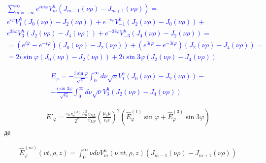 \textcolor{blue} { \begin{equation*} \begin{aligned}
\sum_{m=-\infty}^\infty e^{im \varphi}
V_m^h \left( J_{m-1} (\nu \rho) - J_{m+1} (\nu \rho) \right) = \\
e^{  i \varphi} V_{ 1}^h \left( J_0 (\nu \rho) - J_2 (\nu \rho) \right) +
e^{- i \varphi} V_{-1}^h \left( J_2 (\nu \rho) - J_0 (\nu \rho) \right) + \\
e^{ 3i \varphi} V_{ 3}^h \left( J_2 (\nu \rho) - J_4 (\nu \rho) \right) +
e^{-3i \varphi} V_{-3}^h \left( J_4 (\nu \rho) - J_2 (\nu \rho) \right) = \\
= \left( e^{  i \varphi} - e^{- i \varphi} \right)
\left( J_0 (\nu \rho) - J_2 (\nu \rho) \right) +
\left( e^{ 3i \varphi} - e^{-3i \varphi} \right) 
\left( J_2 (\nu \rho) - J_4 (\nu \rho) \right) = \\
= 2i \sin \varphi \left( J_0 (\nu \rho) - J_2 (\nu \rho) \right) +
2i \sin 3 \varphi \left( J_2 (\nu \rho) - J_4 (\nu \rho) \right)
\end{aligned} \end{equation*} }

\textcolor{blue} { \begin{equation*} \begin{aligned}
E_\varphi =
- \frac{i \sin \varphi}{\sqrt{\epsilon_0}} \int_0^\infty d \nu
\sqrt{\nu} V_1^h \left( J_0 (\nu \rho) - J_2 (\nu \rho) \right) - \\
- \frac{i \sin 3 \varphi}{\sqrt{\epsilon_0}} \int_0^\infty d \nu
\sqrt{\nu} V_3^h \left( J_2 (\nu \rho) - J_4 (\nu \rho) \right)
\end{aligned} \end{equation*} }

\begin{equation} \begin{aligned} \label{eq:ephi_kerr}
E'_\varphi = \frac{\epsilon_0 \chi_e^{(3)} A_0^3}{2^7}
\frac{v_{NL}}{v_{LN}}
\left( \frac{\mu_0 \mu}{\epsilon_0 \epsilon} \right)^2
\left(\hat{E}_\varphi^{(1)} \sin \varphi +
\hat{E}_\varphi^{(3)} \sin 3 \varphi \right)
\end{aligned} \end{equation}
%
де 

\begin{equation} \begin{aligned} \label{eq:ephi_norm}
\hat{E}_\varphi^{(m)} (vt, \rho, z) = 
\int_0^\infty \nu d \nu V_m^h (\nu | vt, \rho, z)
\left( J_{m-1} (\nu \rho) - J_{m+1} (\nu \rho) \right)
\end{aligned} \end{equation}

